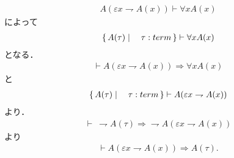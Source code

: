 	\begin{align}
		A(\varepsilon x \rightharpoondown A(x)) \vdash \forall x A(x)
	\end{align}
	によって
	\begin{align}
		\left\{\, A(\tau) \mid \quad \tau:term\, \right\} \vdash \forall x A(x)
	\end{align}
	となる．
	\begin{align}
		\vdash A(\varepsilon x \rightharpoondown A(x)) \Longrightarrow \forall x A(x)
	\end{align}
	と
	\begin{align}
		\left\{\, A(\tau) \mid \quad \tau:term\, \right\} \vdash A(\varepsilon x \rightharpoondown A(x))
	\end{align}
	より．
	\begin{align}
		\vdash\ \rightharpoondown A(\tau) \Longrightarrow \rightharpoondown A(\varepsilon x \rightharpoondown A(x))
	\end{align}
	より
	\begin{align}
		\vdash A(\varepsilon x \rightharpoondown A(x)) \Longrightarrow A(\tau).
	\end{align}